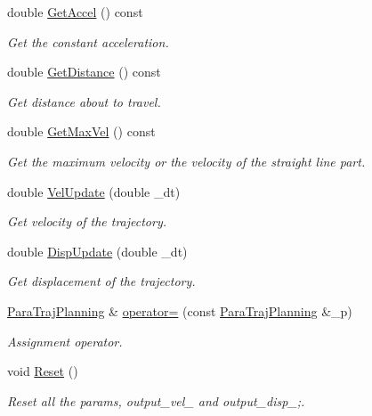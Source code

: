 \begin{DoxyCompactItemize}
double \hyperlink{classnubot_1_1ParaTrajPlanning_af6d435d152a9598331b8f42f26e862a6}{Get\-Accel} () const 
\begin{DoxyCompactList}\small\item\em Get the constant acceleration. \end{DoxyCompactList}\item 
double \hyperlink{classnubot_1_1ParaTrajPlanning_a98156410db22d0048f638162b4403c9f}{Get\-Distance} () const 
\begin{DoxyCompactList}\small\item\em Get distance about to travel. \end{DoxyCompactList}\item 
double \hyperlink{classnubot_1_1ParaTrajPlanning_a60026b9eba695f86b863698c3d33f43f}{Get\-Max\-Vel} () const 
\begin{DoxyCompactList}\small\item\em Get the maximum velocity or the velocity of the straight line part. \end{DoxyCompactList}\item 
double \hyperlink{classnubot_1_1ParaTrajPlanning_a3a4b6ed645ce4640aba3a7611a6c1c8a}{Vel\-Update} (double \-\_\-dt)
\begin{DoxyCompactList}\small\item\em Get velocity of the trajectory. \end{DoxyCompactList}\item 
double \hyperlink{classnubot_1_1ParaTrajPlanning_ae2b2627faba381d49489c161971a1929}{Disp\-Update} (double \-\_\-dt)
\begin{DoxyCompactList}\small\item\em Get displacement of the trajectory. \end{DoxyCompactList}\item 
\hyperlink{classnubot_1_1ParaTrajPlanning}{Para\-Traj\-Planning} \& \hyperlink{classnubot_1_1ParaTrajPlanning_a85ca97603d3b9eb66bd6ce010c51e467}{operator=} (const \hyperlink{classnubot_1_1ParaTrajPlanning}{Para\-Traj\-Planning} \&\-\_\-p)
\begin{DoxyCompactList}\small\item\em Assignment operator. \end{DoxyCompactList}\item 
void \hyperlink{classnubot_1_1ParaTrajPlanning_afebeebbaf531a808175168e09c33d0f1}{Reset} ()
\begin{DoxyCompactList}\small\item\em Reset all the params, output\-\_\-vel\-\_\- and output\-\_\-disp\-\_\-;. \end{DoxyCompactList}\end{DoxyCompactItemize}
